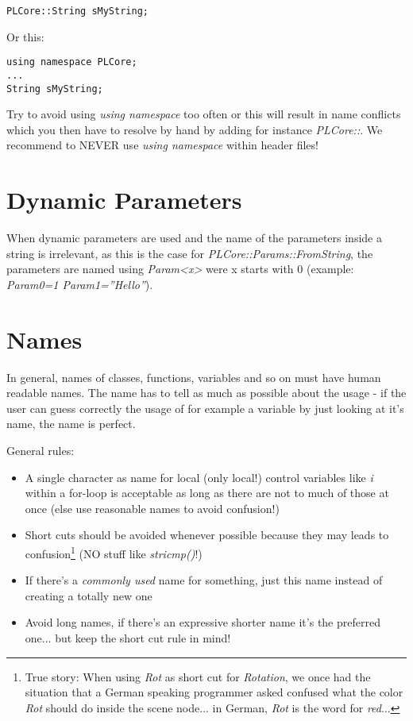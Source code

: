 \begin{lstlisting}[caption=Explicit namespace]
PLCore::String sMyString;
\end{lstlisting}

Or this:

\begin{lstlisting}[caption=Using namespace]
using namespace PLCore;
...
String sMyString;
\end{lstlisting}

Try to avoid using \emph{using namespace} too often or this will result in name conflicts which you then have to resolve by hand by adding for instance \emph{PLCore::}. We recommend to NEVER use \emph{using namespace} within header files!




\section{Dynamic Parameters}
When dynamic parameters are used and the name of the parameters inside a string is irrelevant, as this is the case for \emph{PLCore::Params::FromString}, the parameters are named using \emph{Param<x>} were x starts with $0$ (example: \emph{Param0=1 Param1=''Hello''}).  




\section{Names}
In general, names of classes, functions, variables and so on must have human readable names. The name has to tell as much as possible about the usage - if the user can guess correctly the usage of for example a variable by just looking at it's name, the name is perfect.

General rules:

\begin{itemize}
\item A single character as name for local (only local!) control variables like \emph{i} within a for-loop is acceptable as long as there are not to much of those at once (else use reasonable names to avoid confusion!)
\item Short cuts should be avoided whenever possible because they may leads to confusion\footnote{True story: When using \emph{Rot} as short cut for \emph{Rotation}, we once had the situation that a German speaking programmer asked confused what the color \emph{Rot} should do inside the scene node... in German, \emph{Rot} is the word for \emph{red}...} (NO stuff like \emph{stricmp()}!)
\item If there's a \emph{commonly used} name for something, just this name instead of creating a totally new one
\item Avoid long names, if there's an expressive shorter name it's the preferred one... but keep the short cut rule in mind!
\end{itemize}

